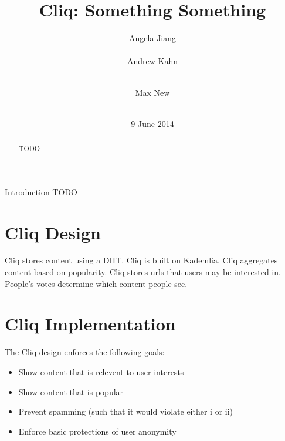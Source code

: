 \documentclass{sig-alternate}
\begin{document}
\nocite{*}


\title{Cliq: Something Something}


\author{
\alignauthor Angela Jiang\\
  \\
\alignauthor Andrew Kahn\\
  \\
\and
\alignauthor Max New\\
  \\
}

\date{9 June 2014}

\maketitle
\begin{abstract}
  TODO
\end{abstract}
\begin{section}{Introduction}
  TODO
\end{section}

\section{Cliq Design}

Cliq stores content using a DHT. 
Cliq is built on Kademlia. 
Cliq aggregates content based on popularity. 
Cliq stores urls that users may be interested in. 
People's votes determine which content people see. 

\section{Cliq Implementation}

The Cliq design enforces the following goals: 

\begin{itemize}
\item Show content that is relevent to user interests
\item Show content that is popular
\item Prevent spamming (such that it would violate either i or ii)
\item Enforce basic protections of user anonymity
\end{itemize}
\end{document}
